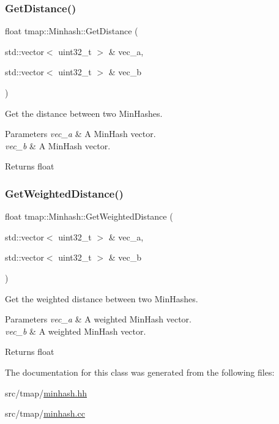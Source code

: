 \subsubsection{\texorpdfstring{Get\+Distance()}{GetDistance()}}
{\footnotesize\ttfamily float tmap\+::\+Minhash\+::\+Get\+Distance (\begin{DoxyParamCaption}\item[{std\+::vector$<$ uint32\+\_\+t $>$ \&}]{vec\+\_\+a,  }\item[{std\+::vector$<$ uint32\+\_\+t $>$ \&}]{vec\+\_\+b }\end{DoxyParamCaption})}



Get the distance between two Min\+Hashes. 


\begin{DoxyParams}{Parameters}
{\em vec\+\_\+a} & A Min\+Hash vector. \\
\hline
{\em vec\+\_\+b} & A Min\+Hash vector. \\
\hline
\end{DoxyParams}
\begin{DoxyReturn}{Returns}
float 
\end{DoxyReturn}
\mbox{\label{classtmap_1_1Minhash_a7a8090c1629a6783fe0e17b227bd59ca}} 
\subsubsection{\texorpdfstring{Get\+Weighted\+Distance()}{GetWeightedDistance()}}
{\footnotesize\ttfamily float tmap\+::\+Minhash\+::\+Get\+Weighted\+Distance (\begin{DoxyParamCaption}\item[{std\+::vector$<$ uint32\+\_\+t $>$ \&}]{vec\+\_\+a,  }\item[{std\+::vector$<$ uint32\+\_\+t $>$ \&}]{vec\+\_\+b }\end{DoxyParamCaption})}



Get the weighted distance between two Min\+Hashes. 


\begin{DoxyParams}{Parameters}
{\em vec\+\_\+a} & A weighted Min\+Hash vector. \\
\hline
{\em vec\+\_\+b} & A weighted Min\+Hash vector. \\
\hline
\end{DoxyParams}
\begin{DoxyReturn}{Returns}
float 
\end{DoxyReturn}


The documentation for this class was generated from the following files\+:\begin{DoxyCompactItemize}
\item 
src/tmap/\hyperlink{minhash_8hh}{minhash.\+hh}\item 
src/tmap/\hyperlink{minhash_8cc}{minhash.\+cc}\end{DoxyCompactItemize}

